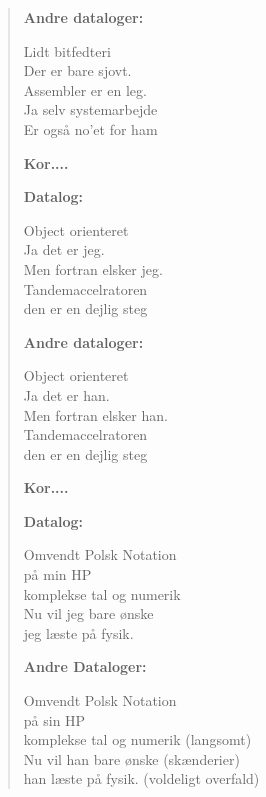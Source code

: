 \documentclass[a4paper,11pt]{article}
\begin{document}
\begin{verse}
\bigskip

{\bf Andre dataloger:}

Lidt bitfedteri \\
Der er bare sjovt. \\
Assembler er en leg. \\
Ja selv systemarbejde \\
Er også no'et for ham 

\bigskip

{\bf Kor....}

\bigskip

{\bf Datalog:}

Object orienteret \\
Ja det er jeg. \\
Men fortran elsker jeg. \\
Tandemaccelratoren \\
den er en dejlig steg

\bigskip

{\bf Andre dataloger:}

Object orienteret \\
Ja det er han. \\
Men fortran elsker han. \\
Tandemaccelratoren \\
den er en dejlig steg

\bigskip

{\bf Kor....}

\bigskip

{\bf Datalog:}

Omvendt Polsk Notation \\
på min HP \\
komplekse tal og numerik \\
Nu vil jeg bare ønske \\
jeg læste på fysik. 

\bigskip

{\bf Andre Dataloger:}

Omvendt Polsk Notation \\
på sin HP \\
komplekse tal og numerik (langsomt) \\
Nu vil han bare ønske	  (skænderier) \\
han læste på fysik.	  (voldeligt overfald)

\end{verse}
\end{document}
